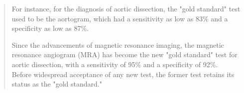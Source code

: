 \documentclass[compress]{beamer}        %
\begin{document}
\begin{frame}
	\large
	\begin{framed}
		\begin{quote}
			For instance, for the diagnosis of aortic dissection, the "gold standard" test used to be the aortogram, which had a sensitivity as low as 83\% and a specificity as low as 87\%. \\ \smallskip
			
			Since the advancements of magnetic resonance imaging, the magnetic resonance angiogram (MRA) has become the new "gold standard" test for aortic dissection, with a sensitivity of 95\% and a specificity of 92\%. 
			\\ \smallskip
			Before widespread acceptance of any new test, the former test retains its status as the "gold standard."
		\end{quote}
	\end{framed}
	
\end{frame}
\end{document}
